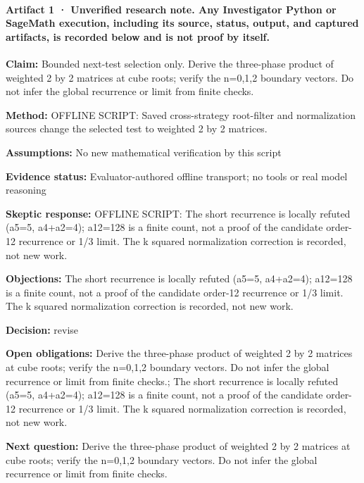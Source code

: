 \documentclass[11pt]{article}
\begin{document}
\paragraph{Artifact 1 · Unverified research note. Any Investigator Python or SageMath execution, including its source, status, output, and captured artifacts, is recorded below and is not proof by itself.}
\textbf{Claim:} Bounded next-test selection only. Derive the three-phase product of weighted 2 by 2 matrices at cube roots; verify the n=0,1,2 boundary vectors. Do not infer the global recurrence or limit from finite checks.\par
\textbf{Method:} OFFLINE SCRIPT: Saved cross-strategy root-filter and normalization sources change the selected test to weighted 2 by 2 matrices.\par
\textbf{Assumptions:} No new mathematical verification by this script\par
\textbf{Evidence status:} Evaluator-authored offline transport; no tools or real model reasoning\par
\textbf{Skeptic response:} OFFLINE SCRIPT: The short recurrence is locally refuted (a5=5, a4+a2=4); a12=128 is a finite count, not a proof of the candidate order-12 recurrence or 1/3 limit. The k squared normalization correction is recorded, not new work.\par
\textbf{Objections:} The short recurrence is locally refuted (a5=5, a4+a2=4); a12=128 is a finite count, not a proof of the candidate order-12 recurrence or 1/3 limit. The k squared normalization correction is recorded, not new work.\par
\textbf{Decision:} revise\par
\textbf{Open obligations:} Derive the three-phase product of weighted 2 by 2 matrices at cube roots; verify the n=0,1,2 boundary vectors. Do not infer the global recurrence or limit from finite checks.; The short recurrence is locally refuted (a5=5, a4+a2=4); a12=128 is a finite count, not a proof of the candidate order-12 recurrence or 1/3 limit. The k squared normalization correction is recorded, not new work.\par
\textbf{Next question:} Derive the three-phase product of weighted 2 by 2 matrices at cube roots; verify the n=0,1,2 boundary vectors. Do not infer the global recurrence or limit from finite checks.\par
\end{document}

